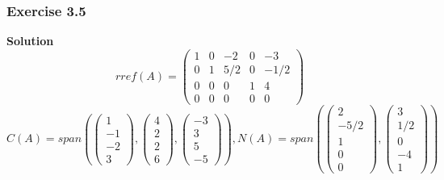 \documentclass{beamer}
\begin{document}
\begin{frame}
    \frametitle{Exercise 3.5}
    \textbf{Solution}
    \begin{equation*}
        rref(A)=\begin{pmatrix}
            1&0&-2&0&-3\\
            0&1&5/2&0&-1/2\\
            0&0&0&1&4\\
            0&0&0&0&0
        \end{pmatrix}
    \end{equation*}
    \begin{equation*}
        C(A)=span(\begin{pmatrix}
            1\\-1\\-2\\3
        \end{pmatrix},\begin{pmatrix}
            4\\2\\2\\6
        \end{pmatrix},\begin{pmatrix}
            -3\\3\\5\\-5
        \end{pmatrix}), N(A)=span(\begin{pmatrix}
            2\\-5/2\\1\\0\\0
        \end{pmatrix},\begin{pmatrix}
            3\\1/2\\0\\-4\\1
        \end{pmatrix})
    \end{equation*}
\end{frame}
    
\end{document}
